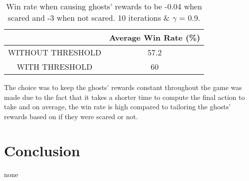 \documentclass[12pt]{report}
\begin{document}
        \begin{table}[h!]
          \begin{center}
            \begin{tabular}{c|c}
              \textbf{} & \textbf{Average Win Rate (\%)} \\
              \hline
              WITHOUT THRESHOLD & 57.2\\
              WITH THRESHOLD & 60\\
            \end{tabular}
            \caption{Win rate when causing ghosts' rewards to be -0.04 when scared and -3 when not scared. 10 iterations \& $\gamma$ = 0.9.}
            \label{tab:table4}
          \end{center}
        \end{table}

          The choice was to keep the ghosts' rewards constant throughout the game was made due to the fact that it takes a shorter time to compute the final action to take and on average, the win rate is high compared to tailoring the ghosts' rewards based on if they were scared or not.




  \section*{Conclusion}
  none
\end{document}
